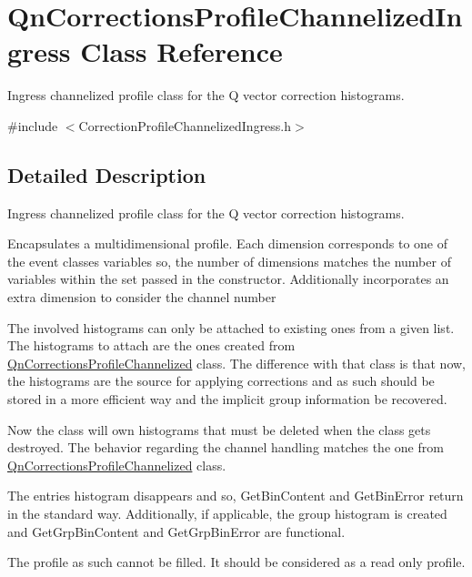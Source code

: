 \hypertarget{classQnCorrectionsProfileChannelizedIngress}{}\section{Qn\+Corrections\+Profile\+Channelized\+Ingress Class Reference}
\label{classQnCorrectionsProfileChannelizedIngress}


Ingress channelized profile class for the Q vector correction histograms.  




{\ttfamily \#include $<$Correction\+Profile\+Channelized\+Ingress.\+h$>$}



\subsection{Detailed Description}
Ingress channelized profile class for the Q vector correction histograms. 

Encapsulates a multidimensional profile. Each dimension corresponds to one of the event classes variables so, the number of dimensions matches the number of variables within the set passed in the constructor. Additionally incorporates an extra dimension to consider the channel number

The involved histograms can only be attached to existing ones from a given list. The histograms to attach are the ones created from \mbox{\hyperlink{classQnCorrectionsProfileChannelized}{Qn\+Corrections\+Profile\+Channelized}} class. The difference with that class is that now, the histograms are the source for applying corrections and as such should be stored in a more efficient way and the implicit group information be recovered.

Now the class will own histograms that must be deleted when the class gets destroyed. The behavior regarding the channel handling matches the one from \mbox{\hyperlink{classQnCorrectionsProfileChannelized}{Qn\+Corrections\+Profile\+Channelized}} class.

The entries histogram disappears and so, Get\+Bin\+Content and Get\+Bin\+Error return in the standard way. Additionally, if applicable, the group histogram is created and Get\+Grp\+Bin\+Content and Get\+Grp\+Bin\+Error are functional.

The profile as such cannot be filled. It should be considered as a read only profile.

